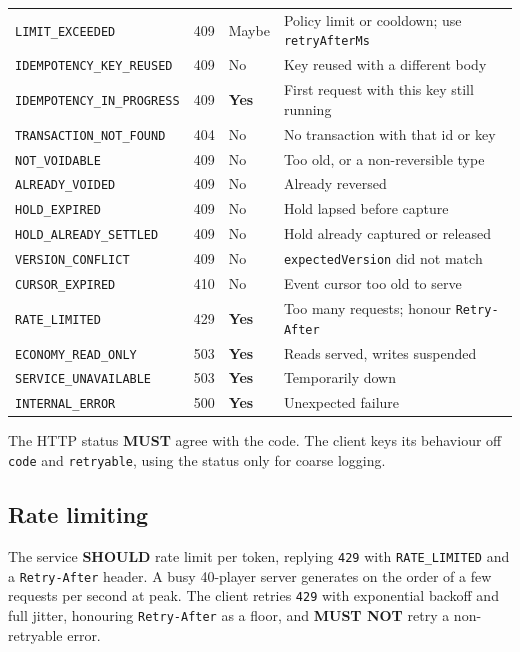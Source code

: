 \documentclass[11pt,a4paper]{article}
\newcommand{\code}[1]{\texttt{\small #1}}
\newcommand{\req}{\textbf{MUST}}
\newcommand{\rec}{\textbf{SHOULD}}
\begin{document}
\begin{longtable}{L{5.0cm} L{1.0cm} L{1.6cm} L{6.4cm}}
\code{LIMIT\_EXCEEDED}               & 409 & Maybe & Policy limit or cooldown; use \code{retryAfterMs}\\
\code{IDEMPOTENCY\_KEY\_REUSED}      & 409 & No  & Key reused with a different body\\
\code{IDEMPOTENCY\_IN\_PROGRESS}     & 409 & \textbf{Yes} & First request with this key still running\\
\code{TRANSACTION\_NOT\_FOUND}       & 404 & No  & No transaction with that id or key\\
\code{NOT\_VOIDABLE}                 & 409 & No  & Too old, or a non-reversible type\\
\code{ALREADY\_VOIDED}               & 409 & No  & Already reversed\\
\code{HOLD\_EXPIRED}                 & 409 & No  & Hold lapsed before capture\\
\code{HOLD\_ALREADY\_SETTLED}        & 409 & No  & Hold already captured or released\\
\code{VERSION\_CONFLICT}             & 409 & No  & \code{expectedVersion} did not match\\
\code{CURSOR\_EXPIRED}               & 410 & No  & Event cursor too old to serve\\
\code{RATE\_LIMITED}                 & 429 & \textbf{Yes} & Too many requests; honour \code{Retry-After}\\
\code{ECONOMY\_READ\_ONLY}           & 503 & \textbf{Yes} & Reads served, writes suspended\\
\code{SERVICE\_UNAVAILABLE}          & 503 & \textbf{Yes} & Temporarily down\\
\code{INTERNAL\_ERROR}               & 500 & \textbf{Yes} & Unexpected failure\\
\bottomrule
\end{longtable}

The HTTP status \req{} agree with the code. The client keys its behaviour off \code{code} and
\code{retryable}, using the status only for coarse logging.

\subsection{Rate limiting}

The service \rec{} rate limit per token, replying \code{429} with \code{RATE\_LIMITED} and a
\code{Retry-After} header. A busy 40-player server generates on the order of a few requests per
second at peak. The client retries \code{429} with exponential backoff and full jitter, honouring
\code{Retry-After} as a floor, and \textbf{MUST NOT} retry a non-retryable error.
\end{document}
